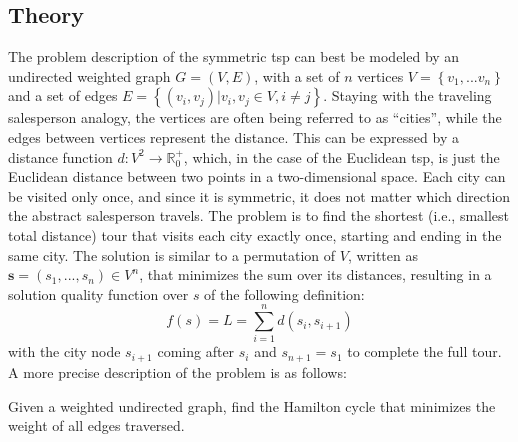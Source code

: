 \subsection{Theory}
\label{chap:tsp-theory}
The problem description of the symmetric \gls{tsp}  can best be modeled by an undirected weighted graph $G = (V,E)$, with a set of $n$ vertices $V = \left\lbrace v_1, ... v_n\right\rbrace $ and a set of edges $E = \left\lbrace (v_i,v_j) | v_i,v_j \in V, i \neq j\right\rbrace $. Staying with the traveling salesperson analogy, the vertices are often being referred to as \enquote{cities}, while the edges between vertices represent the distance. This can be expressed by a distance function $d : V^2 \rightarrow \mathbb{R}_{0}^{+}$, which, in the case of the Euclidean \gls{tsp}, is just the Euclidean distance between two points in a two-dimensional space.  Each city can be visited only once, and since it is symmetric, it does not matter which direction the abstract salesperson travels. The problem is to find the shortest (i.e., smallest total distance) tour that visits each city exactly once, starting and ending in the same city. The solution is similar to a permutation of $V$, written as $\textbf{s} = (s_1,...,s_n) \in V^n$, that minimizes the sum over its distances, resulting in a solution quality function over $s$ of the following definition:
\begin{equation}
	\label{eq:solution_quality}
	f(s) = L = \sum_{i=1}^{n} d(s_i,s_{i+1})
\end{equation}
with the city node $s_{i+1}$ coming after $s_i$ and $s_{n+1} = s_1$ to complete the full tour.
A more precise description of the problem is as follows: 


\begin{list}{}{}
	\item 	Given a weighted undirected graph, find the Hamilton cycle that minimizes the weight of all edges traversed.
\end{list}

